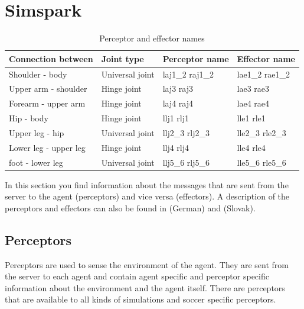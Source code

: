 \chapter{Simspark}

\begin{table}
\label {table:perceptorNames}
\caption{Perceptor and effector names}
\begin{center}
\begin{tabular}{|l|l|l|l|}
\hline
{\bf Connection between}  & {\bf Joint type} & {\bf Perceptor name}& {\bf
Effector name} \\
\hline
Shoulder - body  & Universal joint & laj1\_2  raj1\_2 & lae1\_2   rae1\_2 \\
\hline
Upper arm - shoulder  & Hinge joint & laj3  raj3 & lae3   rae3 \\
\hline
Forearm - upper arm  & Hinge joint & laj4  raj4 & lae4   rae4 \\
\hline
Hip - body  & Hinge joint & llj1  rlj1 & lle1   rle1 \\
\hline
Upper leg - hip & Universal joint & llj2\_3  rlj2\_3 & lle2\_3   rle2\_3 \\
\hline
Lower leg - upper leg & Hinge joint & llj4  rlj4 & lle4   rle4 \\
\hline
foot - lower leg & Universal joint & llj5\_6  rlj5\_6 & lle5\_6   rle5\_6 \\
\hline
\end{tabular}
\end{center}
\end{table}

In this section you find information about the messages that are sent from the
server to the agent (perceptors) and vice versa (effectors). A description of
the perceptors and effectors can also be found in \cite{SchillingJ} (German) and \cite{Lekavy} (Slovak).

\section{Perceptors}
Perceptors are used to sense the environment of the agent. They are sent from
the server to each agent and contain agent specific and perceptor specific
information about the environment and the agent itself. There are perceptors
that are available to all kinds of simulations and soccer specific perceptors.

